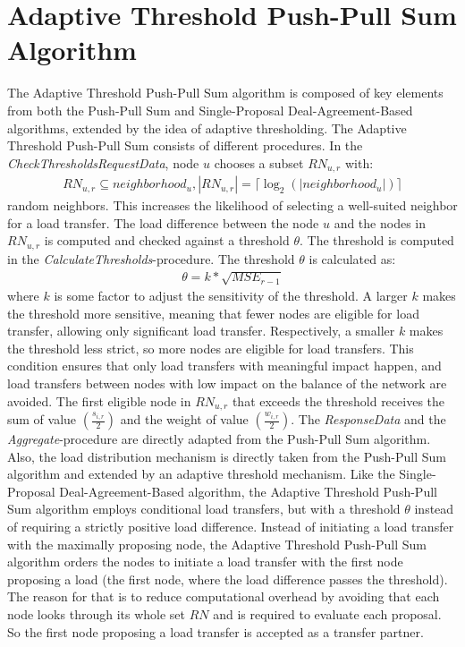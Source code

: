 \section{Adaptive Threshold Push-Pull Sum Algorithm}\label{sec:adaptivethresholdPPS}
The Adaptive Threshold Push-Pull Sum algorithm is composed of key elements from both the Push-Pull Sum and Single-Proposal Deal-Agreement-Based algorithms, extended by the idea of adaptive thresholding. The Adaptive Threshold Push-Pull Sum consists of different procedures. In the \textit{CheckThresholdsRequestData}, node $u$ chooses a subset $RN_{u,r}$ with:
\begin{align}
    RN_{u,r} \subseteq neighborhood_{u}, |RN_{u,r}|=\lceil \log_{2}{(|neighborhood_{u}|)} \rceil
\end{align}
random neighbors. This increases the likelihood of selecting a well-suited neighbor for a load transfer. The load difference between the node $u$ and the nodes in $RN_{u,r}$ is computed and checked against a threshold $\theta$. The threshold is computed in the \textit{CalculateThresholds}-procedure. The threshold $\theta$ is calculated as:
\begin{align}
    \theta = k*\sqrt{MSE_{r-1}}    
\end{align}
where $k$ is some factor to adjust the sensitivity of the threshold. A larger $k$ makes the threshold more sensitive, meaning that fewer nodes are eligible for load transfer, allowing only significant load transfer. Respectively, a smaller $k$ makes the threshold less strict, so more nodes are eligible for load transfers. This condition ensures that only load transfers with meaningful impact happen, and load transfers between nodes with low impact on the balance of the network are avoided. The first eligible node in $RN_{u,r}$ that exceeds the threshold receives the sum of value $(\frac{s_{i,r}}{2})$ and the weight of value $(\frac{w_{i,r}}{2})$. The \textit{ResponseData} and the \textit{Aggregate}-procedure are directly adapted from the Push-Pull Sum algorithm. Also, the load distribution mechanism is directly taken from the Push-Pull Sum algorithm and extended by an adaptive threshold mechanism. Like the Single-Proposal Deal-Agreement-Based algorithm, the Adaptive Threshold Push-Pull Sum algorithm employs conditional load transfers, but with a threshold $\theta$ instead of requiring a strictly positive load difference. Instead of initiating a load transfer with the maximally proposing node, the Adaptive Threshold Push-Pull Sum algorithm orders the nodes to initiate a load transfer with the first node proposing a load (the first node, where the load difference passes the threshold). The reason for that is to reduce computational overhead by avoiding that each node looks through its whole set $RN$ and is required to evaluate each proposal. So the first node proposing a load transfer is accepted as a transfer partner.

